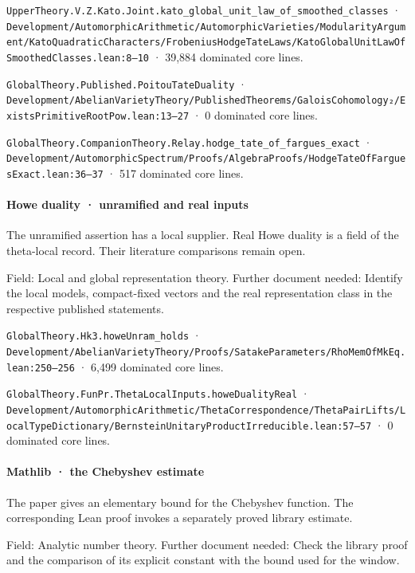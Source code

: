 \nolinkurl{UpperTheory.V.Z.Kato.Joint.kato_global_unit_law_of_smoothed_classes} · \nolinkurl{Development/AutomorphicArithmetic/AutomorphicVarieties/ModularityArgument/KatoQuadraticCharacters/FrobeniusHodgeTateLaws/KatoGlobalUnitLawOfSmoothedClasses.lean:8–10} · 39,884 dominated core lines.

\nolinkurl{GlobalTheory.Published.PoitouTateDuality} · \nolinkurl{Development/AbelianVarietyTheory/PublishedTheorems/GaloisCohomology₂/ExistsPrimitiveRootPow.lean:13–27} · 0 dominated core lines.

\nolinkurl{GlobalTheory.CompanionTheory.Relay.hodge_tate_of_fargues_exact} · \nolinkurl{Development/AutomorphicSpectrum/Proofs/AlgebraProofs/HodgeTateOfFarguesExact.lean:36–37} · 517 dominated core lines.

\paragraph{Howe duality · unramified and real inputs}

The unramified assertion has a local supplier. Real Howe duality is a field of the theta-local record. Their literature comparisons remain open.

Field: Local and global representation theory. Further document needed: Identify the local models, compact-fixed vectors and the real representation class in the respective published statements.

\nolinkurl{GlobalTheory.Hk3.howeUnram_holds} · \nolinkurl{Development/AbelianVarietyTheory/Proofs/SatakeParameters/RhoMemOfMkEq.lean:250–256} · 6,499 dominated core lines.

\nolinkurl{GlobalTheory.FunPr.ThetaLocalInputs.howeDualityReal} · \nolinkurl{Development/AutomorphicArithmetic/ThetaCorrespondence/ThetaPairLifts/LocalTypeDictionary/BernsteinUnitaryProductIrreducible.lean:57–57} · 0 dominated core lines.

\paragraph{Mathlib · the Chebyshev estimate}

The paper gives an elementary bound for the Chebyshev function. The corresponding Lean proof invokes a separately proved library estimate.

Field: Analytic number theory. Further document needed: Check the library proof and the comparison of its explicit constant with the bound used for the window.

